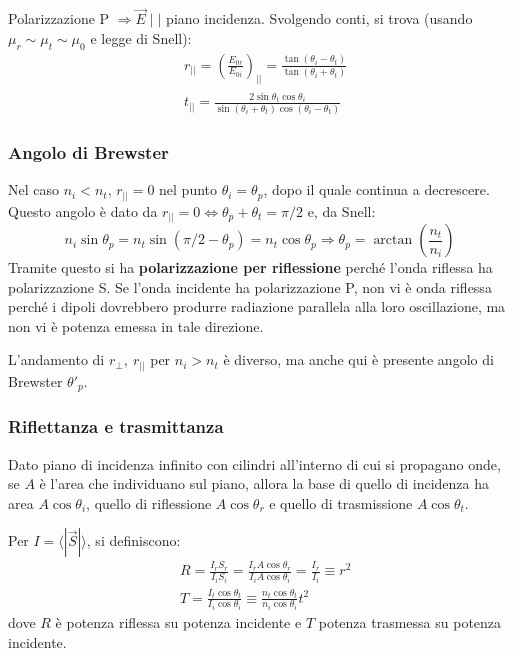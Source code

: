 \documentclass[10pt, a4paper]{scrartcl}
\numberwithin{equation}{subsection}
\theoremstyle{style1}
\begin{document}
Polarizzazione P $\Rightarrow \vec{E}  \mid   \mid $ piano incidenza. Svolgendo conti, si trova (usando $\mu _r\sim\mu _t \sim\mu _0$ e legge di Snell):
\begin{equation}
	\begin{split}
		&r_{| |} = \left(\frac{E_{0r} }{E_{0i} }\right) _{| |} = \frac{\tan(\theta _i - \theta _t)}{\tan (\theta _i + \theta _t)}  \\
		&t_{| | } = \frac{2 \sin \theta _t \cos \theta _i}{\sin( \theta_i + \theta _t) \cos(\theta _i - \theta _t) } 
	\end{split}
\end{equation}
\subsubsection{Angolo di Brewster}

Nel caso $n_i < n_t$, $r_{ | |} =0 $ nel punto $\theta _i = \theta _p$, dopo il quale continua a decrescere. Questo angolo \`e dato da $r_{| |} =0 \iff\theta _p + \theta _t = \pi/2 $ e, da Snell:
\begin{equation}
	n_i \sin \theta _p = n_t \sin(\pi / 2 - \theta _p) = n_t \cos \theta _p \Rightarrow \theta _p = \arctan \left(\frac{n_t}{n_i}\right) 
\end{equation}
Tramite questo si ha \textbf{polarizzazione per riflessione} perch\'e l'onda riflessa ha polarizzazione S. Se l'onda incidente ha polarizzazione P, non vi \`e onda riflessa perch\'e i dipoli dovrebbero produrre radiazione parallela alla loro oscillazione, ma non vi \`e potenza emessa in tale direzione.

L'andamento di $r_\perp, \ r_{| | } $ per $n_i > n_t$ \`e diverso, ma anche qui \`e presente angolo di Brewster $\theta' _p$.
\subsubsection{Riflettanza e trasmittanza}

Dato piano di incidenza infinito con cilindri all'interno di cui si propagano onde, se $A$ \`e l'area che individuano sul piano, allora la base di quello di incidenza ha area $A\cos \theta _i$, quello di riflessione $A \cos \theta _r$ e quello di trasmissione $A \cos\theta _t$. 

Per $I = \langle |\vec{S}| \rangle$, si definiscono:
\begin{equation}
	\begin{split}
		&R = \frac{I_r S_r}{I_i S_i} = \frac{I_r A\cos \theta _r}{I_i A\cos \theta _i} = \frac{I_r}{I_i} \equiv r^2\\
		&T = \frac{I_t\cos\theta _t}{I_i \cos\theta _i} \equiv \frac{n_t \cos\theta _t}{n_i \cos\theta _i}t^2
	\end{split}
\end{equation}
dove $R$ \`e potenza riflessa su potenza incidente e $T$ potenza trasmessa su potenza incidente.
\end{document}
